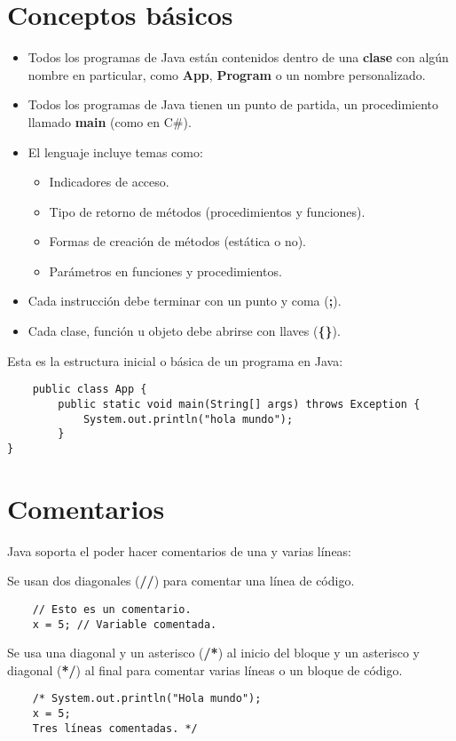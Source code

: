 \section{Conceptos básicos}
\begin{itemize}
    \item Todos los programas de Java están contenidos dentro de una \textbf{clase} con algún nombre en particular, como \textbf{App}, \textbf{Program} o un nombre personalizado.
    \item Todos los programas de Java tienen un punto de partida, un procedimiento llamado \textbf{main} (como en C\#).
    \item El lenguaje incluye temas como:
    \begin{itemize}
        \item Indicadores de acceso.
        \item Tipo de retorno de métodos (procedimientos y funciones).
        \item Formas de creación de métodos (estática o no).
        \item Parámetros en funciones y procedimientos.
    \end{itemize}
    \item Cada instrucción debe terminar con un punto y coma (\textbf{;}).
    \item Cada clase, función u objeto debe abrirse con llaves (\textbf{\{\}}).
\end{itemize}
Esta es la estructura inicial o básica de un programa en Java:
\begin{lstlisting}
    public class App {
        public static void main(String[] args) throws Exception {
            System.out.println("hola mundo");
        }
}
\end{lstlisting}



\section{Comentarios}

Java soporta el poder hacer comentarios de una y varias líneas:

Se usan dos diagonales (\textbf{//}) para comentar una línea de código.
\begin{lstlisting}
    // Esto es un comentario.
    x = 5; // Variable comentada.
\end{lstlisting}

Se usa una diagonal y un asterisco (\textbf{/*}) al inicio del bloque y un asterisco y diagonal (\textbf{*/}) al final para comentar varias líneas o un bloque de código.
\begin{lstlisting}
    /* System.out.println("Hola mundo");
    x = 5;
    Tres líneas comentadas. */
\end{lstlisting}

